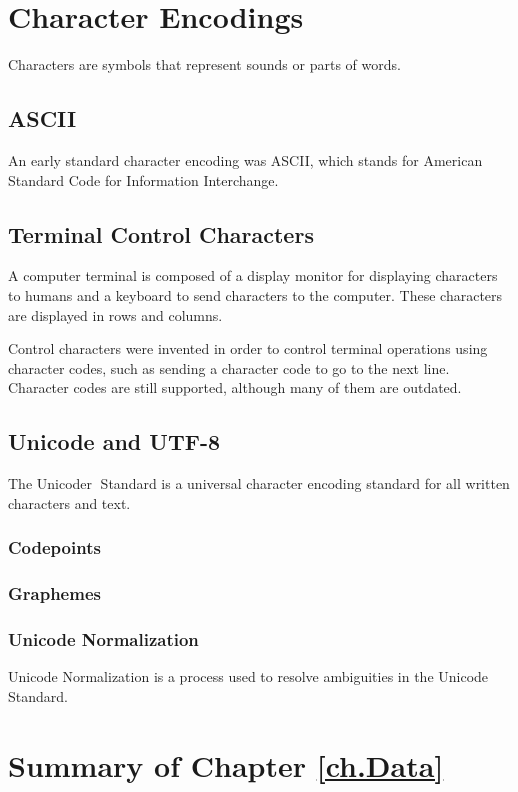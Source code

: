 \documentclass{book}
\begin{document}
\section{Character Encodings}
Characters are symbols that represent sounds or parts of words.

\subsection{ASCII}
An early standard character encoding was ASCII, which stands for
American Standard Code for Information Interchange.

\subsection{Terminal Control Characters}
A computer terminal is composed of a display monitor for displaying
characters to humans and a keyboard to send characters to the
computer. These characters are displayed in rows and columns.

Control characters were invented in order to control terminal 
operations using character codes, such as sending a character code
to go to the next line. Character codes are still supported, although
many of them are outdated.

\subsection{Unicode and UTF-8}
The Unicode\textcircled{r} Standard is a universal character
encoding standard for all written characters and text.

\subsubsection{Codepoints}

\subsubsection{Graphemes}


\subsubsection{Unicode Normalization}
Unicode Normalization is a process used to resolve ambiguities in the
Unicode Standard.

\section{Summary of Chapter \ref{ch.Data}}

\backmatter
{}
\printindex
\end{document}
